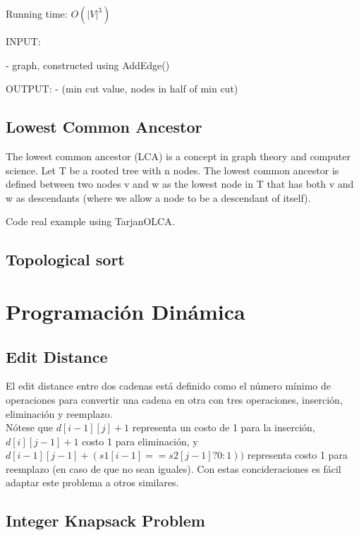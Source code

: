 \documentclass[10pt,letterpaper,twocolumn,twosided]{article}
\newcommand{\codigofuente}[1]{

\dotfill
}
\begin{document}
Running time:
$ O(|V|^3) $


INPUT: 

- graph, constructed using AddEdge()

OUTPUT:
- (min cut value, nodes in half of min cut)

\codigofuente{src/graphs/mincut.cpp}


\subsection{Lowest Common Ancestor}

The lowest common ancestor (LCA) is a concept in graph theory and computer science. Let T be a rooted tree with n nodes. The lowest common ancestor is defined between two nodes v and w as the lowest node in T that has both v and w as descendants (where we allow a node to be a descendant of itself).

Code real example using TarjanOLCA.

\codigofuente{src/graphs/tarjanOLCA.cpp}


\subsection{Topological sort}
\codigofuente{src/graphs/toposort.cpp}

\section{Programación Dinámica}

\subsection{Edit Distance}

El edit distance entre dos cadenas está definido como el número mínimo de operaciones para convertir una cadena en otra
con tres operaciones, inserción, eliminación y reemplazo.\\
Nótese que $d[i - 1][j] + 1$ representa un costo de 1 para la inserción, $d[i][j - 1] + 1$ costo 1 para eliminación, y $d[i - 1][j - 1] + (s1[i - 1] == s2[j - 1] ? 0 : 1))$ representa costo 1 para reemplazo (en caso de que no sean iguales). Con estas concideraciones es fácil adaptar este problema a otros similares.

\codigofuente{src/dp/edit_distance.cpp}

\subsection{Integer Knapsack Problem}
\end{document}
